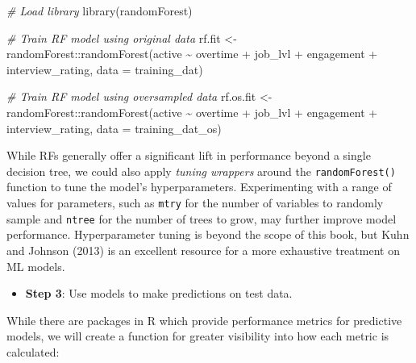 \documentclass[
]{book}
\newenvironment{Shaded}{\begin{snugshade}}{\end{snugshade}}
\newcommand{\AttributeTok}[1]{\textcolor[rgb]{0.77,0.63,0.00}{#1}}
\newcommand{\CommentTok}[1]{\textcolor[rgb]{0.56,0.35,0.01}{\textit{#1}}}
\newcommand{\FunctionTok}[1]{\textcolor[rgb]{0.00,0.00,0.00}{#1}}
\newcommand{\NormalTok}[1]{#1}
\newcommand{\OtherTok}[1]{\textcolor[rgb]{0.56,0.35,0.01}{#1}}
\newcommand{\SpecialCharTok}[1]{\textcolor[rgb]{0.00,0.00,0.00}{#1}}
\providecommand{\tightlist}{%
  \setlength{\itemsep}{0pt}\setlength{\parskip}{0pt}}
\begin{document}
\begin{Shaded}
\begin{Highlighting}[]
\CommentTok{\# Load library}
\FunctionTok{library}\NormalTok{(randomForest)}

\CommentTok{\# Train RF model using original data}
\NormalTok{rf.fit }\OtherTok{\textless{}{-}}\NormalTok{ randomForest}\SpecialCharTok{::}\FunctionTok{randomForest}\NormalTok{(active }\SpecialCharTok{\textasciitilde{}}\NormalTok{ overtime }\SpecialCharTok{+}\NormalTok{ job\_lvl }\SpecialCharTok{+}\NormalTok{ engagement }\SpecialCharTok{+}\NormalTok{ interview\_rating, }\AttributeTok{data =}\NormalTok{ training\_dat)}

\CommentTok{\# Train RF model using oversampled data}
\NormalTok{rf.os.fit }\OtherTok{\textless{}{-}}\NormalTok{ randomForest}\SpecialCharTok{::}\FunctionTok{randomForest}\NormalTok{(active }\SpecialCharTok{\textasciitilde{}}\NormalTok{ overtime }\SpecialCharTok{+}\NormalTok{ job\_lvl }\SpecialCharTok{+}\NormalTok{ engagement }\SpecialCharTok{+}\NormalTok{ interview\_rating, }\AttributeTok{data =}\NormalTok{ training\_dat\_os)}
\end{Highlighting}
\end{Shaded}

While RFs generally offer a significant lift in performance beyond a single decision tree, we could also apply \emph{tuning wrappers} around the \texttt{randomForest()} function to tune the model's hyperparameters. Experimenting with a range of values for parameters, such as \texttt{mtry} for the number of variables to randomly sample and \texttt{ntree} for the number of trees to grow, may further improve model performance. Hyperparameter tuning is beyond the scope of this book, but Kuhn and Johnson (2013) is an excellent resource for a more exhaustive treatment on ML models.

\begin{itemize}
\tightlist
\item
  \textbf{Step 3}: Use models to make predictions on test data.
\end{itemize}

While there are packages in R which provide performance metrics for predictive models, we will create a function for greater visibility into how each metric is calculated:
\end{document}
